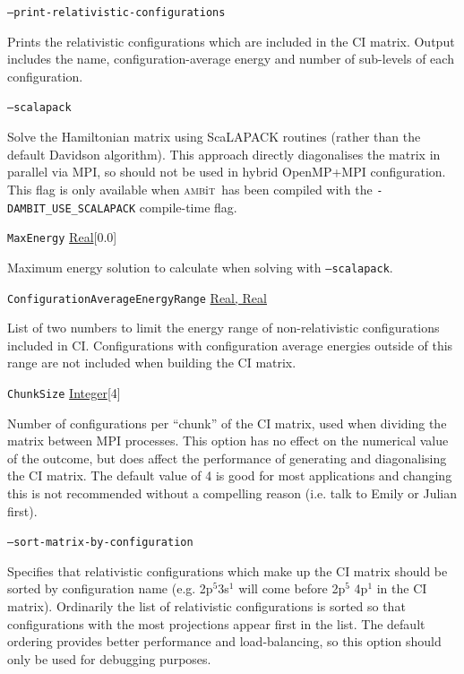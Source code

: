 \documentclass{report}
\newcommand{\ambit}{\textsc{amb}{\footnotesize i}\textsc{t}}
\begin{document}
\texttt{--print-relativistic-configurations}
\begin{adjustwidth}{1cm}{}
Prints the relativistic configurations which are included in the CI matrix.
Output includes the name, configuration-average energy and number of sub-levels of each configuration.
\end{adjustwidth}

\texttt{--scalapack}
\begin{adjustwidth}{1cm}{}
Solve the Hamiltonian matrix using ScaLAPACK routines (rather than the default Davidson algorithm). 
This approach directly diagonalises the matrix in parallel via MPI, so should not be used in hybrid
OpenMP+MPI configuration. This flag is only available when \ambit\ has been compiled with the
\texttt{-DAMBIT\_USE\_SCALAPACK} compile-time flag.
\end{adjustwidth}

\texttt{MaxEnergy} \uline{Real}[0.0]
\begin{adjustwidth}{1cm}{}
Maximum energy solution to calculate when solving with \texttt{--scalapack}.
\end{adjustwidth}

\texttt{ConfigurationAverageEnergyRange} \uline{Real, Real}
\begin{adjustwidth}{1cm}{}
List of two numbers to limit the energy range of non-relativistic configurations included in CI.
Configurations with configuration average energies outside of this range are not included when building
the CI matrix.
\end{adjustwidth}

\texttt{ChunkSize} \uline{Integer}[4]
\begin{adjustwidth}{1cm}{}
Number of configurations per ``chunk'' of the CI matrix, used when dividing the matrix between MPI
processes. This option has no effect on the numerical 
value of the outcome, but does affect the performance of generating and diagonalising the CI matrix. 
The default value of 4 is good for most applications and changing this is not recommended without a 
compelling reason (i.e. talk to Emily or Julian first).
\end{adjustwidth}

\texttt{--sort-matrix-by-configuration}
\begin{adjustwidth}{1cm}{}
Specifies that relativistic configurations which make up the CI matrix should be sorted by configuration
name (e.g. 2p$^5$3s$^1$ will come before 2p$^5$ 4p$^1$ in the CI matrix). Ordinarily the list of
relativistic configurations is sorted so that configurations with the most projections appear first in
the list. The default ordering provides better performance and load-balancing, so this option should
only be used for debugging purposes.
\end{adjustwidth}
\end{document}
